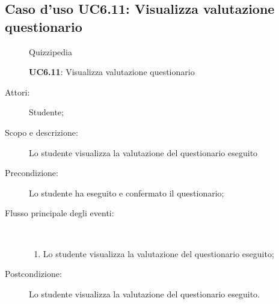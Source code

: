 \subsection{Caso d'uso UC6.11: Visualizza valutazione questionario}
	\begin{figure}[H]
		\centering
		\begin{resizedtikzpicture}{\textwidth}
		\begin{umlsystem}[x=0, fill=lightgray!20]{Quizzipedia}
		\end{umlsystem}
		\end{resizedtikzpicture}
		\caption{\textbf{UC6.11}: Visualizza valutazione questionario}
		\label{UC6.11}
	\end{figure}
\begin{description}
\item[Attori:] Studente;
\item[Scopo e descrizione:] Lo studente visualizza la valutazione del questionario eseguito
      \item[Precondizione:] Lo studente ha eseguito e confermato il questionario;

        \item[Flusso principale degli eventi:] \ 
 \begin{enumerate}
          \item Lo studente visualizza la valutazione del questionario eseguito;

      \end{enumerate}
    \item[Postcondizione:] Lo studente visualizza la valutazione del questionario eseguito.
  \end{description}
\hypertarget{UC7}{}
